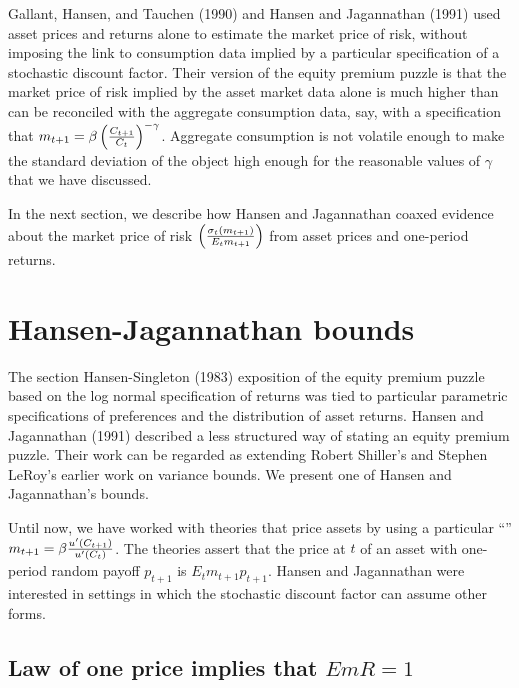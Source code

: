     Gallant, Hansen, and Tauchen (1990) and Hansen and
Jagannathan (1991) used asset prices and  returns alone
to estimate the market price of risk, without
imposing the link to consumption data implied by a
particular specification of a stochastic discount factor.
Their version of the equity premium puzzle is that
the market price of risk implied by the asset market data alone
is much higher than can be reconciled with the aggregate
consumption data, say, with
a specification that
$ m_{t+1} = \beta \left( {C_{t+1} \over C_t }\right)^{-\gamma}$.
Aggregate consumption is not volatile enough to make the
standard deviation of the object  high enough for the reasonable
values of $\gamma$ that we have  discussed.

  In the next section, we describe how Hansen and Jagannathan
coaxed evidence about the market price of risk $\left({\sigma_t (m_{t+1}) \over E_t m_{t+1} }\right)$ from
asset prices and one-period returns.


\section{Hansen-Jagannathan bounds}\label{sec:HJbounds}%
   The section  Hansen-Singleton (1983) exposition of the equity premium
puzzle based on the log normal specification
of returns  was
 tied to  particular parametric specifications of preferences
and the distribution of  asset returns.
Hansen and Jagannathan (1991)  described
a less structured   way of stating an equity premium puzzle.
Their work can be regarded as  extending  Robert Shiller's and
Stephen LeRoy's earlier work on  variance bounds.
We present one of Hansen and Jagannathan's bounds.

%

Until now, we have worked with theories that
price assets by using a particular ``''
 $m_{t+1} = \beta {u'(C_{t+1}) \over u'(C_t)}$.  The  theories
assert that the price at $t$ of  an asset with one-period random payoff $p_{t+1}$
is $E_t m_{t+1} p_{t+1}$.  Hansen and Jagannathan were interested in settings
in which the stochastic discount factor can assume
other forms.


\subsection{Law of one price implies that $E m R =1$}

